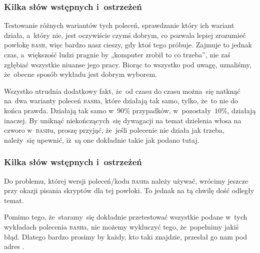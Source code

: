 \documentclass[10pt,t]{beamer}
\begin{document}
\begin{frame}
  \frametitle{Kilka słów wstępnych i~ostrzeżeń}


  Testowanie różnych wariantów tych poleceń, sprawdzanie który ich wariant
  działa, a~który nie, jest oczywiście czymś dobrym, co pozwala lepiej
  zrozumieć powłokę \textsc{bash}, więc bardzo nasz cieszy, gdy ktoś tego
  próbuje. Zajmuje to jednak czas, a~większość ludzi pragnie by „komputer
  zrobił to co trzeba”, nie zaś zgłębiać wszystkie niuanse jego pracy.
  Biorąc to wszystko pod uwagę, uznaliśmy, że~obecne sposób wykładu jest
  dobrym wyborem.

  Wszystko utrudnia dodatkowy fakt, że~od czasu do czasu można~się natknąć
  na~dwa warianty poleceń \textsc{bash}a, które działają tak samo, tylko,
  że~to nie do końca prawda. Działają tak samo w~$90\%$ przypadków,
  w~pozostały~$10\%$, działają inaczej. By uniknąć niekończących~się
  dywagacji na temat dzielenia włosa na czworo w~\textsc{bash}u, proszę
  przyjąć, że~jeśli polecenie nie działa jak trzeba, należy~się upewnić,
  iż~są one \alert{dokładnie} takie jak podano tutaj.

\end{frame}





\begin{frame}
  \frametitle{Kilka słów wstępnych i~ostrzeżeń}


  Do problemu, której wersji poleceń/kodu \textsc{bash}a należy używać,
  wrócimy jeszcze przy okazji pisania skryptów dla tej powłoki. To jednak
  na tą chwilę dość odległy temat.

  Pomimo tego, że~staramy~się dokładnie przetestować wszystkie podane
  w~tych wykładach polecenia \textsc{bash}a, nie możemy wykluczyć tego,
  że~popełnimy jakiś błąd. Dlatego bardzo prosimy by każdy, kto taki
  znajdzie, przesłał go nam pod adres \email.

\end{frame}
\end{document}
